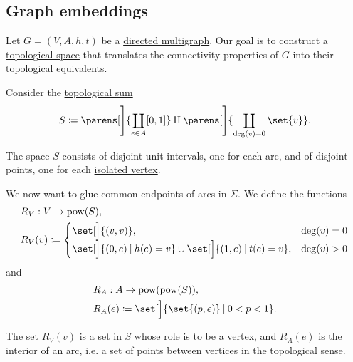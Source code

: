 \subsection{Graph embeddings}\label{subsec:graph_embeddings}

\begin{definition}\label{def:graph_geometric_realization}\mimprovised
  Let \( G = (V, A, h, t) \) be a \hyperref[def:directed_multigraph]{directed multigraph}. Our goal is to construct a \hyperref[def:topological_space]{topological space} that translates the connectivity properties of \( G \) into their topological equivalents.

  Consider the \hyperref[def:topological_sum]{topological sum}
  \begin{equation*}
    S \coloneqq \parens[\Bigg]{ \coprod_{e \in A} [0, 1] } \amalg \parens[\Bigg]{ \coprod_{\deg(v) = 0} \set{ v } }.
  \end{equation*}

  The space \( S \) consists of disjoint unit intervals, one for each arc, and of disjoint points, one for each \hyperref[def:graph_cardinality/directed_degree]{isolated vertex}.

  We now want to glue common endpoints of arcs in \( \Sigma \). We define the functions
  \begin{equation}\label{eq:def:graph_geometric_realization/rv}
    \begin{aligned}
      &R_V: V \to \pow(S), \\
      &R_V(v) \coloneqq \begin{cases}
        \set[\Big]{ (v, v) },                                                           &\deg(v) = 0 \\
        \set[\Big]{ (0, e) \given h(e) = v } \cup \set[\Big]{ (1, e) \given t(e) = v }, &\deg(v) > 0
      \end{cases}
    \end{aligned}
  \end{equation}
  and
  \begin{equation}\label{eq:def:graph_geometric_realization/ra}
    \begin{aligned}
      &R_A: A \to \pow(\pow(S)), \\
      &R_A(e) \coloneqq \set[\Big]{ \set{ (p, e) } \given 0 < p < 1 }.
    \end{aligned}
  \end{equation}

  The set \( R_V(v) \) is a set in \( S \) whose role is to be a vertex, and \( R_A(e) \) is the interior of an arc, i.e. a set of points between vertices in the topological sense.


\end{definition}
